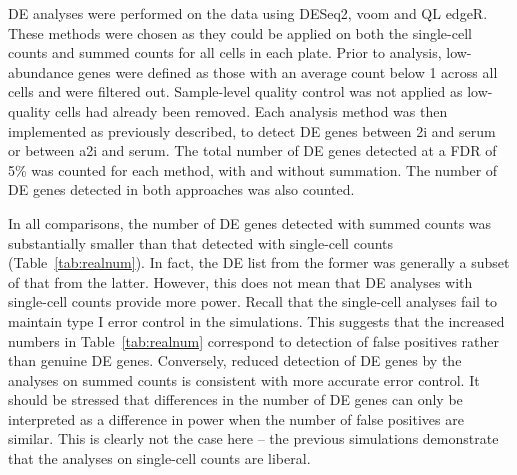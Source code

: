 \documentclass[oupdraft]{bio}
\begin{document}


DE analyses were performed on the data using DESeq2, voom and QL edgeR.
These methods were chosen as they could be applied on both the single-cell counts and summed counts for all cells in each plate. 
Prior to analysis, low-abundance genes were defined as those with an average count below 1 across all cells and were filtered out.
Sample-level quality control was not applied as low-quality cells had already been removed.
Each analysis method was then implemented as previously described, to detect DE genes between 2i and serum or between a2i and serum.
The total number of DE genes detected at a FDR of 5\% was counted for each method, with and without summation.
The number of DE genes detected in both approaches was also counted.

In all comparisons, the number of DE genes detected with summed counts was substantially smaller than that detected with single-cell counts (Table~\ref{tab:realnum}).
In fact, the DE list from the former was generally a subset of that from the latter.
However, this does not mean that DE analyses with single-cell counts provide more power.
Recall that the single-cell analyses fail to maintain type I error control in the simulations.
This suggests that the increased numbers in Table~\ref{tab:realnum} correspond to detection of false positives rather than genuine DE genes.
Conversely, reduced detection of DE genes by the analyses on summed counts is consistent with more accurate error control.
It should be stressed that differences in the number of DE genes can only be interpreted as a difference in power when the number of false positives are similar.
This is clearly not the case here -- the previous simulations demonstrate that the analyses on single-cell counts are liberal.
\end{document}
